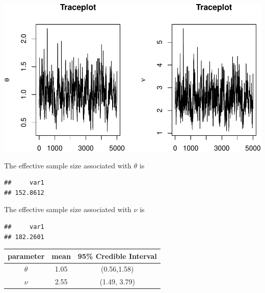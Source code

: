 \documentclass[]{article}
\begin{document}
\includegraphics{AMS206b_H4_files/figure-latex/unnamed-chunk-25-1.pdf}

The effective sample size associated with \(\theta\) is

\begin{verbatim}
##     var1 
## 152.8612
\end{verbatim}

The effective sample size associated with \(\nu\) is

\begin{verbatim}
##     var1 
## 182.2601
\end{verbatim}

\begin{center}
\begin{tabular}{ |c|c|c| }
\hline
 parameter & mean & 95\% Credible Interval \\ 
 \hline
 $\theta$ & 1.05 & (0.56,1.58) \\  
 $\nu$ & 2.55 & (1.49, 3.79)\\
 \hline
\end{tabular}
\end{center}
\end{document}
